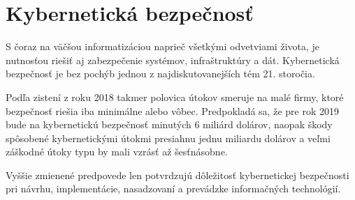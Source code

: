 \chapter{Kybernetická bezpečnosť}
{}

S čoraz na väčšou informatizáciou naprieč všetkými odvetviami života, je nutnosťou riešiť aj zabezpečenie systémov, infraštruktúry a dát. Kybernetická bezpečnosť je bez pochýb jednou z najdiskutovanejších tém 21. storočia.
 
Podľa zistení z roku 2018 takmer polovica útokov smeruje na malé firmy, ktoré bezpečnosť riešia iba minimálne alebo vôbec. Predpokladá sa, že pre rok 2019 bude na kybernetickú bezpečnosť minutých 6 miliárd dolárov, naopak škody spôsobené kybernetickými útokmi presiahnu jednu miliardu dolárov a veľmi záškodné útoky typu  by mali vzrásť až šesťnásobne. \cite{Milkovich3122018} 

Vyššie zmienené predpovede len potvrdzujú dôležitosť kybernetickej  bezpečnosti pri návrhu, implementácie, nasadzovaní a prevádzke informačných technológií.




